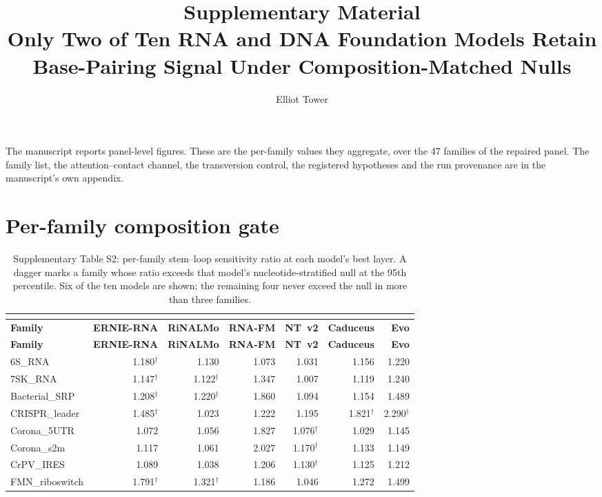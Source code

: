 \documentclass[11pt]{article}
\title{Supplementary Material\\Only Two of Ten RNA and DNA Foundation Models
Retain Base-Pairing Signal Under Composition-Matched Nulls}
\author{Elliot Tower}
\date{}
\begin{document}
\maketitle

The manuscript reports panel-level figures. These are the per-family values they
aggregate, over the 47 families of the repaired
panel. The family list, the attention--contact channel, the transversion
control, the registered hypotheses and the run provenance are in the
manuscript's own appendix.

\section*{Per-family composition gate}

\begin{longtable}{@{}lrrrrrr@{}}
\caption{Supplementary Table S2: per-family stem--loop sensitivity ratio at each model's best layer. A dagger marks a family whose ratio exceeds that model's nucleotide-stratified null at the 95th percentile. Six of the ten models are shown; the remaining four never exceed the null in more than three families.}\\
\label{tab:s2}\\
\toprule
\textbf{Family} & \textbf{ERNIE-RNA} & \textbf{RiNALMo} & \textbf{RNA-FM} & \textbf{NT~v2} & \textbf{Caduceus} & \textbf{Evo} \\
\midrule
\endfirsthead
\toprule
\textbf{Family} & \textbf{ERNIE-RNA} & \textbf{RiNALMo} & \textbf{RNA-FM} & \textbf{NT~v2} & \textbf{Caduceus} & \textbf{Evo} \\
\midrule
\endhead
6S\_RNA & 1.180$^\dagger$ & 1.130 & 1.073 & 1.031 & 1.156 & 1.220 \\
7SK\_RNA & 1.147$^\dagger$ & 1.122$^\dagger$ & 1.347 & 1.007 & 1.119 & 1.240 \\
Bacterial\_SRP & 1.208$^\dagger$ & 1.220$^\dagger$ & 1.860 & 1.094 & 1.154 & 1.489 \\
CRISPR\_leader & 1.485$^\dagger$ & 1.023 & 1.222 & 1.195 & 1.821$^\dagger$ & 2.290$^\dagger$ \\
Corona\_5UTR & 1.072 & 1.056 & 1.827 & 1.076$^\dagger$ & 1.029 & 1.145 \\
Corona\_s2m & 1.117 & 1.061 & 2.027 & 1.170$^\dagger$ & 1.133 & 1.149 \\
CrPV\_IRES & 1.089 & 1.038 & 1.206 & 1.130$^\dagger$ & 1.125 & 1.212 \\
FMN\_riboswitch & 1.791$^\dagger$ & 1.321$^\dagger$ & 1.186 & 1.046 & 1.272 & 1.499 \\

\end{longtable}
\end{document}
